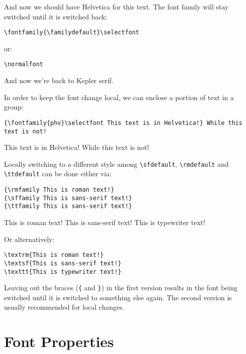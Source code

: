 \documentclass[a4paper,oneside,11pt]{article}
\newcommand\comm[1]{\texttt{\textbackslash#1}}
\newcommand\code[1]{\texttt{#1}}
\begin{document}
\selectfont And now we should have Helvetica for this text. The
font family will stay switched until it is switched back:

\begin{verbatim}
\fontfamily{\familydefault}\selectfont
\end{verbatim}
or:

\begin{verbatim}
\normalfont
\end{verbatim}

\normalfont And now we're back to Kepler serif.

In order to keep the font change local,  we can enclose a portion of text in a
group:

\begin{verbatim}
{\fontfamily{phv}\selectfont This text is in Helvetica!} While this text is not!
\end{verbatim}

{\selectfont This text is in Helvetica!} While this text is not!

Locally   switching    to   a   different   style    among   \comm{sfdefault},
\comm{rmdefault} and \comm{ttdefault} can be done either via:

\begin{verbatim}
{\rmfamily This is roman text!}
{\sffamily This is sans-serif text!}
{\ttfamily This is sans-serif text!}
\end{verbatim}

{\rmfamily This is roman text!}
{\sffamily This is sans-serif text!}
{\ttfamily This is typewriter text!}

Or alternatively:

\begin{verbatim}
\textrm{This is roman text!}
\textsf{This is sans-serif text!}
\texttt{This is typewriter text!}
\end{verbatim}

Leaving out the braces (\code{\{} and  \code{\}}) in the first version results
in the font  being switched until it is switched  to something else again. The
second version is usually recommended for local changes.


\section{Font Properties}
\label{sec:font-props}
\end{document}
